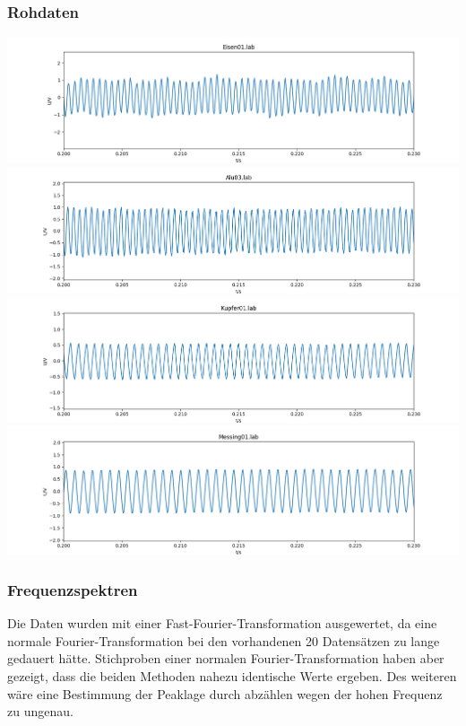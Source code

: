 \documentclass[12pt,a4paper]{article}
\begin{document}
\subsubsection{Rohdaten}
\includegraphics[width=\linewidth,height=\textheight,keepaspectratio]{Bilder/Eisen01.png}
\includegraphics[width=\linewidth,height=\textheight,keepaspectratio]{Bilder/Alu03.png}
\includegraphics[width=\linewidth,height=\textheight,keepaspectratio]{Bilder/Kupfer01.png}
\includegraphics[width=\linewidth,height=\textheight,keepaspectratio]{Bilder/Messing01.png}
\newpage
\subsubsection{Frequenzspektren}
Die Daten wurden mit einer Fast-Fourier-Transformation ausgewertet, da eine normale Fourier-Transformation bei den vorhandenen 20 Datensätzen zu lange gedauert hätte.
Stichproben einer normalen Fourier-Transformation haben aber gezeigt, dass die beiden Methoden nahezu identische Werte ergeben.
Des weiteren wäre eine Bestimmung der Peaklage durch abzählen wegen der hohen Frequenz zu ungenau.\\
\end{document}

